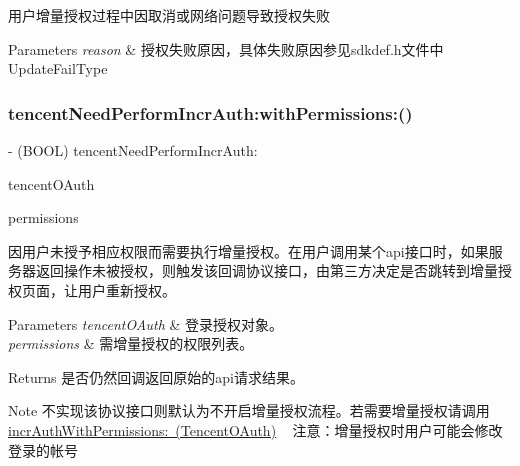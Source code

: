 用户增量授权过程中因取消或网络问题导致授权失败 
\begin{DoxyParams}{Parameters}
{\em reason} & 授权失败原因，具体失败原因参见sdkdef.\+h文件中Update\+Fail\+Type \\
\hline
\end{DoxyParams}
\mbox{\label{protocol_tencent_session_delegate-p_a0e01d339c87d58e9386068abd18fc93b}} 
\subsubsection{\texorpdfstring{tencent\+Need\+Perform\+Incr\+Auth\+:with\+Permissions\+:()}{tencentNeedPerformIncrAuth:withPermissions:()}\hspace{0.1cm}{\footnotesize\ttfamily [1/2]}}
{\footnotesize\ttfamily -\/ (B\+O\+OL) tencent\+Need\+Perform\+Incr\+Auth\+: \begin{DoxyParamCaption}\item[{(\mbox{\hyperlink{interface_tencent_o_auth}{Tencent\+O\+Auth}} $\ast$)}]{tencent\+O\+Auth }\item[{withPermissions:(N\+S\+Array $\ast$)}]{permissions }\end{DoxyParamCaption}\hspace{0.3cm}{\ttfamily [optional]}}

因用户未授予相应权限而需要执行增量授权。在用户调用某个api接口时，如果服务器返回操作未被授权，则触发该回调协议接口，由第三方决定是否跳转到增量授权页面，让用户重新授权。 
\begin{DoxyParams}{Parameters}
{\em tencent\+O\+Auth} & 登录授权对象。 \\
\hline
{\em permissions} & 需增量授权的权限列表。 \\
\hline
\end{DoxyParams}
\begin{DoxyReturn}{Returns}
是否仍然回调返回原始的api请求结果。 
\end{DoxyReturn}
\begin{DoxyNote}{Note}
不实现该协议接口则默认为不开启增量授权流程。若需要增量授权请调用\mbox{\hyperlink{interface_tencent_o_auth_abe9ca35d1c305cc9219cb6738606df2d}{incr\+Auth\+With\+Permissions\+: (Tencent\+O\+Auth)}} ~\newline
注意：增量授权时用户可能会修改登录的帐号 
\end{DoxyNote}
\mbox{\label{protocol_tencent_session_delegate-p_a0e01d339c87d58e9386068abd18fc93b}} 
